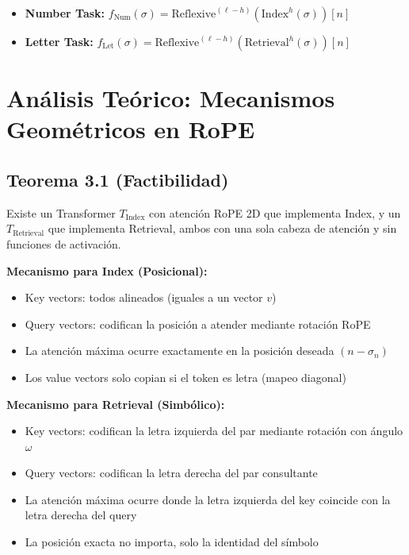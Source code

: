 \documentclass[conference]{IEEEtran}
\begin{document}
\begin{itemize}
    \item \textbf{Number Task:} $f_{\text{Num}}(\sigma) = \text{Reflexive}^{(\ell-h)}(\text{Index}^{h}(\sigma))[n]$
    \item \textbf{Letter Task:} $f_{\text{Let}}(\sigma) = \text{Reflexive}^{(\ell-h)}(\text{Retrieval}^{h}(\sigma))[n]$
\end{itemize}

\section{An\'alisis Te\'orico: Mecanismos Geom\'etricos en RoPE}

\subsection{Teorema 3.1 (Factibilidad)}

Existe un Transformer $T_{\text{Index}}$ con atenci\'on RoPE 2D que implementa Index, y un $T_{\text{Retrieval}}$ que implementa Retrieval, ambos con una sola cabeza de atenci\'on y sin funciones de activaci\'on.

\textbf{Mecanismo para Index (Posicional):}
\begin{itemize}
    \item Key vectors: todos alineados (iguales a un vector $v$)
    \item Query vectors: codifican la posici\'on a atender mediante rotaci\'on RoPE
    \item La atenci\'on m\'axima ocurre exactamente en la posici\'on deseada $(n - \sigma_n)$
    \item Los value vectors solo copian si el token es letra (mapeo diagonal)
\end{itemize}

\textbf{Mecanismo para Retrieval (Simb\'olico):}
\begin{itemize}
    \item Key vectors: codifican la letra izquierda del par mediante rotaci\'on con \'angulo $\omega$
    \item Query vectors: codifican la letra derecha del par consultante
    \item La atenci\'on m\'axima ocurre donde la letra izquierda del key coincide con la letra derecha del query
    \item La posici\'on exacta no importa, solo la identidad del s\'imbolo
\end{itemize}
\end{document}
